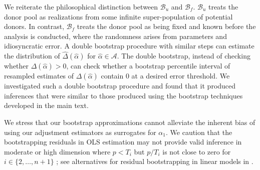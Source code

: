 \documentclass[11pt]{article}
\def\mc#1{\mathcal{#1}} %
\DeclareMathOperator*{\argmax}{arg\,max} %
\theoremstyle{definition}
\begin{document}


We reiterate the philosophical distinction between $\mc{B}_u$ and $\mc{B}_f$. $\mc{B}_u$ treats the donor pool as realizations from some infinite super-population of potential donors. In contrast, $\mc{B}_f$ treats the donor pool as being fixed  and known before the analysis is conducted, where the randomness arises from parameters and idiosyncratic error. A double bootstrap procedure with similar steps can estimate the distribution of $\hat\Delta(\hat{\alpha})$ for $\hat{\alpha} \in \mc{A}$. The double bootstrap, instead of checking whether $\Delta(\hat{\alpha})>0$, can check whether a bootstrap percentile interval of resampled estimates of $\Delta(\hat{\alpha})$ contain 0 at a desired error threshold. We investigated such a double bootstrap procedure and found that it produced inferences that were similar to those produced using the bootstrap techniques developed in the main text.

We stress that our bootstrap approximations cannot alleviate the inherent bias of using our adjustment estimators as surrogates for $\alpha_1$. We caution that the bootstrapping residuals in OLS estimation may not provide valid inference in moderate or high dimension where $p < T_i$ but $p / T_i$ is not close to zero for $i\in \{2, \ldots, n+1\}$ \citep{el2018can}; see alternatives for residual bootstrapping in linear models in \citet{el2018can}. 
\end{document}
